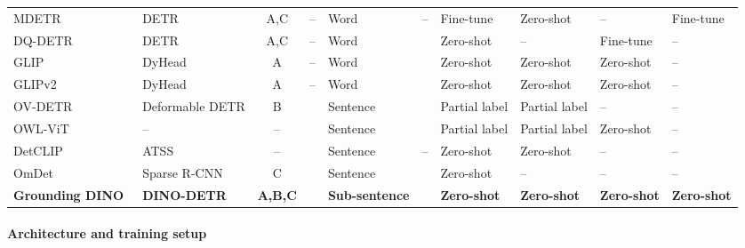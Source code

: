\begin{enrichment}
\begin{table}[H]
{\begin{tabular}{l l c c l c l l l l}
				MDETR~\cite{kamath2021_mdetr}             & DETR              & A,C & --     & Word         & --    & Fine-tune    & Zero-shot     & --         & Fine-tune \\
				DQ-DETR~\cite{liu2022_dqdetr}             & DETR              & A,C & --     & Word         & \cmark & Zero-shot    & --            & Fine-tune  & -- \\
				GLIP~\cite{li2022_glip}                   & DyHead            & A   & --     & Word         & \cmark & Zero-shot    & Zero-shot     & Zero-shot  & -- \\
				GLIPv2~\cite{zhang2022_glipv2}            & DyHead            & A   & --     & Word         & \cmark & Zero-shot    & Zero-shot     & Zero-shot  & -- \\
				OV-DETR~\cite{zang2022_ovdetr}            & Deformable DETR   & B   & \cmark & Sentence     & \cmark & Partial label & Partial label & --         & -- \\
				OWL-ViT~\cite{minderer2022_owlvit}        & --                & --  & \cmark & Sentence     & \cmark & Partial label & Partial label & Zero-shot  & -- \\
				DetCLIP~\cite{yao2022_detclip}            & ATSS              & --  & \cmark & Sentence     & --    & Zero-shot    & Zero-shot     & --         & -- \\
				OmDet~\cite{zhao2024_omdet}               & Sparse R-CNN      & C   & \cmark & Sentence     & \cmark & Zero-shot    & --            & --         & -- \\
				\textbf{Grounding DINO}~\cite{liu2023_groundingdino} & \textbf{DINO-DETR} & \textbf{A,B,C} & \textbf{\cmark} & \textbf{Sub-sentence} & \textbf{\cmark} & \textbf{Zero-shot} & \textbf{Zero-shot} & \textbf{Zero-shot} & \textbf{Zero-shot} \\
				\bottomrule
		\end{tabular}}
	\end{table}
	
\newpage
	
	\begin{enrichment}
		\label{enr:chapter14_groundingdino_architecture}
		
		\paragraph{Architecture and training setup}
		

\end{enrichment}
\end{enrichment}
